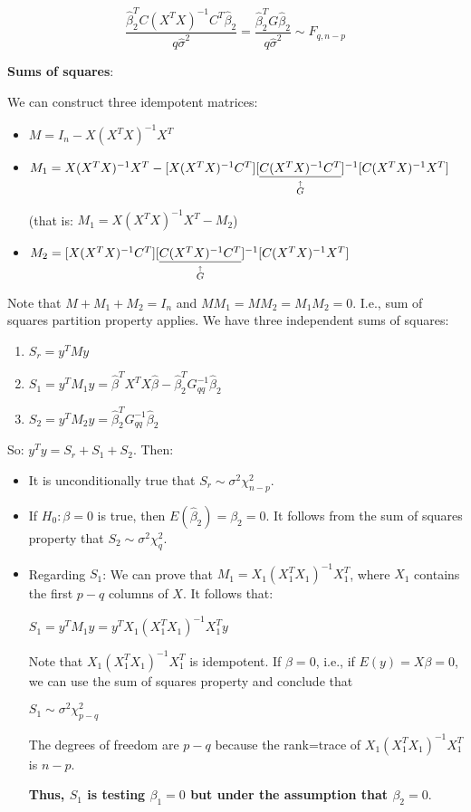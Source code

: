 \begin{equation}
\frac{\hat{\beta}_2^T C (X^T X)^{-1} C^T \hat{\beta}_2}{q\hat{\sigma}^2} = 
\frac{\hat{\beta}_2^T G \hat{\beta}_2}{q\hat{\sigma}^2}
 \sim F_{q,n-p}
\end{equation}


\textbf{Sums of squares}:

We can construct three idempotent matrices:

\begin{itemize}
\item
$M = I_n - X(X^T X)^{-1} X^T$
\item
$M_1 =  X(X^T X)^{-1} X^T -   [X(X^T X)^{-1} C^T]  [\explain{\underline{C (X^T X)^{-1} C^T}}{G}]^{-1}  
[C(X^T X)^{-1} X^T]$

(that is: $M_1 =  X(X^T X)^{-1} X^T - M_2$)

\item $M_2 = [X(X^T X)^{-1} C^T]  [\explain{\underline{C (X^T X)^{-1} C^T}}{G}]^{-1}  
[C(X^T X)^{-1} X^T]$
\end{itemize}

Note that $M+M_1+M_2=I_n$ and $MM_1=MM_2=M_1M_2=0$. I.e., sum of squares partition property applies. We have three independent sums of squares:

\begin{enumerate}
\item $S_r = y^T M y$
\item $S_1 = y^T M_1 y = \hat{\beta}^T X^T X \hat{\beta}-  \hat{\beta}_2^T G_{qq}^{-1} \hat{\beta}_2$
\item $S_2 = y^T M_2 y =  \hat{\beta}_2^T G_{qq}^{-1} \hat{\beta}_2$
\end{enumerate}

So: $y^T y = S_r + S_1 + S_2$.  Then:

\begin{itemize}
\item It is unconditionally true that $S_r \sim \sigma^2 \chi^2_{n-p}$.
\item If $H_0: \beta=0$ is true, then $E(\hat{\beta}_2) = \beta_2 = 0$. It follows from the sum of squares property that $S_2 \sim \sigma^2 \chi_q^2$.  
\item Regarding $S_1$: 
We can prove that $M_1 = X_1 (X_1^T X_1)^{-1}X_1^T$, where $X_1$ contains the first $p-q$ columns of $X$. It follows that:

$S_1 = y^T M_1 y =y^T X_1 (X_1^T X_1)^{-1}X_1^T  y$

Note that $X_1 (X_1^T X_1)^{-1}X_1^T$ is idempotent. If $\beta=0$, i.e., if $E(y) =X\beta = 0$, we can use the  sum of squares property and conclude that

$S_1 \sim \sigma^2 \chi_{p-q}^2$

The degrees of freedom are $p-q$ because the rank=trace of  $X_1 (X_1^T X_1)^{-1}X_1^T$ is $n-p$.

\textbf{Thus, $S_1$ is testing $\beta_1=0$ but under the assumption that $\beta_2=0$}.

\end{itemize}

